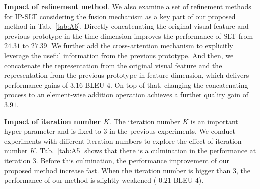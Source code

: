 \documentclass[10pt,twocolumn,letterpaper]{article}
\begin{document}
     

    \smallskip
    \noindent \textbf{Impact of refinement method}.
    We also examine a set of refinement methods for IP-SLT considering the fusion mechanism as a key part of our proposed method in Tab.~\ref{tab:A6}. Directly concatenating the original visual feature and previous prototype in the time dimension improves the performance of SLT from $24.31$ to $27.39$. 
    We further add the cross-attention mechanism to explicitly leverage the useful information from the previous prototype. And then, we concatenate the representation from the original visual feature and the representation from the previous prototype in feature dimension, which delivers performance gains of $3.16$ BLEU-4. On top of that, changing the concatenating process to an element-wise addition operation achieves a further quality gain of $3.91$. 

    \smallskip
    \noindent \textbf{Impact of iteration number $K$}.
    The iteration number $K$ is an important hyper-parameter and is fixed to $3$ in the previous experiments. We conduct experiments with different iteration numbers to explore the effect of iteration number $K$. Tab.~\ref{tab:A5} shows that there is a culmination in the performance at iteration $3$. Before this culmination, the performance improvement of our proposed method increase fast. When the iteration number is bigger than $3$, the performance of our method is slightly weakened (-$0.21$ BLEU-4).

    

    \setlength{\tabcolsep}{5.5pt}
    \begin{table}[!t]
     \scriptsize
     \vspace{0.5mm}
     \caption{
     Effect of the iteration number $K$ in the iterative refinement module.
     }
     \label{tab:A5}
     \vspace{-1mm}
     \end{table}
\end{document}
